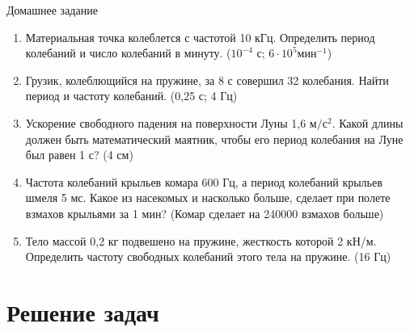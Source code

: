 \documentclass[a6paper, 11pt]{diss_4}
\renewcommand{\'}{\,'}
\begin{document}
\begin{center}
   Домашнее задание
\end{center}
\begin{enumerate}

\item Материальная точка колеблется с частотой 10 кГц. Определить период колебаний и число колебаний в минуту.
($10^{-4}$ с; $6\cdot10^5 мин^{-1}$)

\item Грузик, колеблющийся на пружине, за 8 с совершил 32 колебания. Найти период и частоту колебаний.
(0,25 с;    4 Гц)

\item Ускорение свободного падения на поверхности Луны 1,6 $м/с^2$. Какой длины должен быть математический маятник, чтобы его период колебания на Луне был равен 1 с? (4 см)

\item Частота колебаний крыльев комара 600 Гц, а период колебаний крыльев шмеля 5 мс. Какое из насекомых и насколько больше, сделает при полете взмахов крыльями за 1 мин? (Комар сделает на 240000 взмахов больше)

\item Тело массой 0,2 кг подвешено на пружине, жесткость которой 2 кН/м. Определить частоту свободных колебаний этого тела на пружине. (16 Гц)

\end{enumerate}

\section{Решение задач}
\end{document}

